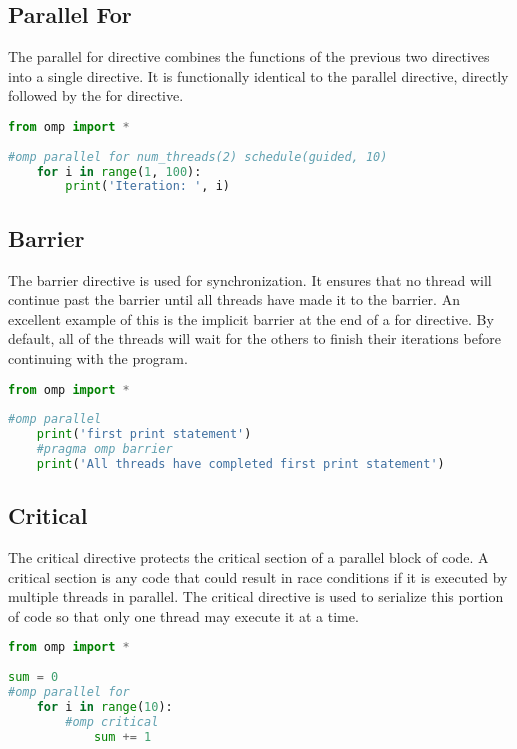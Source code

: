 \documentclass[letterpaper,12pt]{article} %
\begin{document}
\subsection{Parallel For}
The parallel for directive combines the functions of the previous two directives into a single directive. It is functionally identical to the parallel directive, directly followed by the for directive.

\begin{lstlisting}[language=Python]
 from omp import *
 
#omp parallel for num_threads(2) schedule(guided, 10)
	for i in range(1, 100):
		print('Iteration: ', i)
\end{lstlisting}


 
 \subsection{Barrier}
 The barrier directive is used for synchronization. It ensures that no thread will continue past the barrier until all threads have made it to the barrier. An excellent example of this is the implicit barrier at the end of a for directive. By default, all of the threads will wait for the others to finish their iterations before continuing with the program.
  
 \begin{lstlisting}[language=Python]
 from omp import *
 
#omp parallel
	print('first print statement')
	#pragma omp barrier
	print('All threads have completed first print statement')
\end{lstlisting} 



 \subsection{Critical}
 The critical directive protects the critical section of a parallel block of code. A critical section is any code that could result in race conditions if it is executed by multiple threads in parallel. The critical directive is used to serialize this portion of code so that only one thread may execute it at a time. 
 
 \begin{lstlisting}[language=Python]
 from omp import *
 
sum = 0
#omp parallel for
	for i in range(10):
		#omp critical
			sum += 1
\end{lstlisting}
\end{document}
